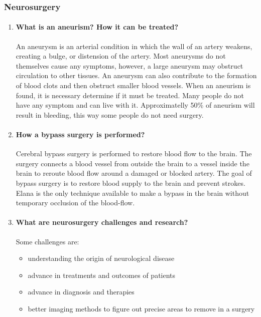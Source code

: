 \documentclass[12pt,article,oneside,a4paper]{memoir}
\begin{document}
\subsubsection{Neurosurgery}
\begin{enumerate}
\item \paragraph{What is an aneurism? How it can be treated?}
An aneurysm is an arterial condition in which the wall of an artery weakens,
creating a bulge, or distension of the artery. Most aneurysms do not themselves
cause any symptoms, however, a large aneurysm may obstruct circulation to other
tissues. An aneurysm can also contribute to the formation of blood clots and
then obstruct smaller blood vessels. When an aneurism is found, it is necessary
determine if it must be treated. Many people do not have any symptom and can
live with it. Approximatelly 50\% of aneurism will result in bleeding, this way
some people do not need surgery.

\item \paragraph{How a bypass surgery is performed?}
Cerebral bypass surgery is performed to restore blood flow to the brain. The
surgery connects a blood vessel from outside the brain to a vessel inside the
brain to reroute blood flow around a damaged or blocked artery. The goal of
bypass surgery is to restore blood supply to the brain and prevent strokes.
Elana is the only technique available to make a bypass in the brain without
temporary occlusion of the blood-flow.

\item \paragraph{What are neurosurgery challenges and research?}
Some challenges are:
\begin{itemize}
\item understanding the origin of neurological disease
\item advance in treatments and outcomes of patients
\item advance in diagnosis and therapies
\item better imaging methods to figure out precise areas to remove in a surgery
\end{itemize}


\end{enumerate}
\end{document}
